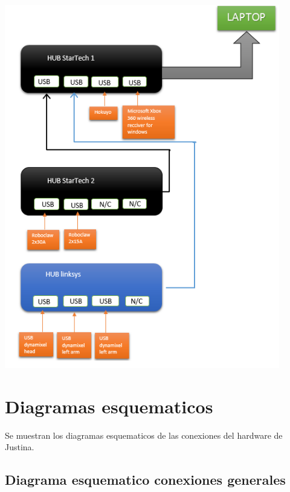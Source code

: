 \documentclass[a4paper]{book}
\begin{document}
\begin{center}
\includegraphics[width=0.9\textwidth]{Figures/Hardware/Diagramas/HUB.png}
\label{fig:Hardware:Diagramas:Justina:HUBs}
\end{center}



\section{Diagramas esquematicos}
Se muestran los diagramas esquematicos de las conexiones del hardware de Justina.


\subsection{Diagrama esquematico conexiones generales}
\end{document}
